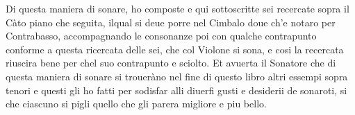 Di questa maniera di sonare, ho composte e qui sottoscritte sei recercate sopra il Càto piano che seguita, ilqual si deue porre nel Cimbalo doue ch'e notaro per Contrabasso, accompagnando le consonanze poi con qualche contrapunto conforme a questa ricercata delle sei, che col Violone si sona, e cosi la recercata riuscira bene per chel suo contrapunto e sciolto. Et avuerta il Sonatore che di questa maniera di sonare si troueràno nel fine di questo libro altri essempi sopra tenori e questi gli ho fatti per sodisfar alli diuerfi gusti e desiderii de sonaroti, si che ciascuno si pigli quello che gli parera migliore e piu bello.
